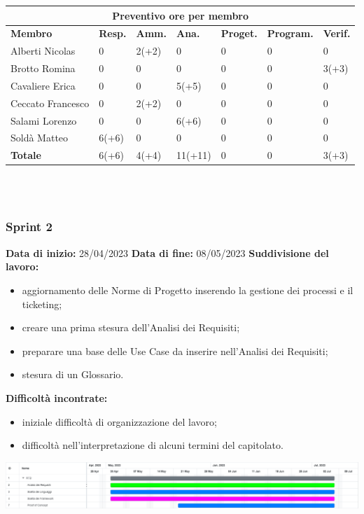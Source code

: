 \documentclass[a4paper, 12pt]{article}
\begin{document}
\begin{center}
	\begin{tabularx}{\textwidth}{|X|X|X|X|X|X|X|}
		\hline
		\multicolumn{7}{|c|}{\textbf{Preventivo ore per membro}}                                      \\
		\hline
		\hline
		\textbf{Membro}  & \textbf{Resp.} & \textbf{Amm.} & \textbf{Ana.} &
		\textbf{Proget.} & \textbf{Program.} & \textbf{Verif.} \\
		\hline
		Alberti Nicolas    	&0 	&2(+2)	&0	&0	&0	&0	\\
		\hline
		Brotto Romina    	&0 	&0	&0	&0	&0	&3(+3)	\\
		\hline
		Cavaliere Erica    	&0 	&0  &5(+5)  &0 &0 &0	\\
		\hline
		Ceccato Francesco   &0 	&2(+2)  &0  &0 &0 &0	\\
		\hline
		Salami Lorenzo    	&0 	&0  & 6(+6) &0 &0 &0	\\
		\hline
		Soldà Matteo    	&6(+6)	&0  &0  &0 &0 &0	\\
		\hline
		\hline
		\textbf{Totale} 	& 6(+6) & 4(+4) & 11(+11) & 0 & 0 & 3(+3)	\\
		\hline
	\end{tabularx}\\[8pt]
	\mbox{}\\
\end{center}

\newpage

\subsubsection{Sprint 2}
\textbf{Data di inizio:} 28/04/2023\newline
\textbf{Data di fine:} 08/05/2023\newline
\newline
\textbf{Suddivisione del lavoro:}
\begin{itemize}
    \item aggiornamento delle Norme di Progetto inserendo la gestione dei processi e il ticketing;
    \item creare una prima stesura dell'Analisi dei Requisiti;
    \item preparare una base delle Use Case da inserire nell'Analisi dei Requisiti;
    \item stesura di un Glossario.
\end{itemize}
\textbf{Difficoltà incontrate:}
\begin{itemize}
    \item iniziale difficoltà di organizzazione del lavoro;
    \item difficoltà nell'interpretazione di alcuni termini  del capitolato.
\end{itemize}
\includegraphics[scale=0.24]{RTB_1.png}\newline
\newline
\end{document}
